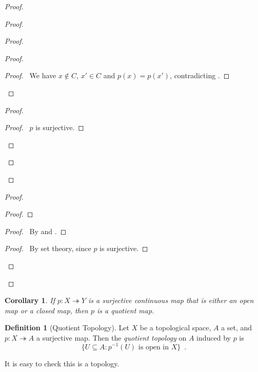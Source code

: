 \documentclass{report}
\let\qed\relax
\newtheorem{cor}{Corollary}[lm]
\theoremstyle{definition}
\newtheorem{df}[lm]{Definition}
\begin{document}
\begin{proof}
\begin{proof}
\begin{proof}
\begin{proof}
          \qedstep
          \begin{proof}
            \pf\ We have $x \notin C$, $x' \in C$ and $p(x) = p(x')$,
            contradicting .
          \end{proof}
        \end{proof}
        \begin{proof}
          \begin{proof}
            \pf\ $p$ is surjective.
          \end{proof}
        \end{proof}
      \end{proof}
    \end{proof}
    \begin{proof}
      \begin{proof}
      \end{proof}
      \begin{proof}
        \pf\ By  and .
      \end{proof}
      \begin{proof}
        \pf\ By set theory, since $p$ is surjective.
      \end{proof}
    \end{proof}
    \qed
  \end{proof}

  \begin{cor}
    If $p : X \twoheadrightarrow Y$ is a surjective continuous map that is
    either an open map or a closed map, then $p$ is a quotient map.
  \end{cor}

  \begin{df}[Quotient Topology]
    Let $X$ be a topological space, $A$ a set, and $p : X \twoheadrightarrow A$
    a surjective map. Then the \emph{quotient topology} on $A$ induced by $p$ is
    \[ \{ U \subseteq A : p^{-1}(U) \text{ is open in } X \} \enspace . \]

    It is easy to check this is a topology.
  \end{df}
\end{document}
